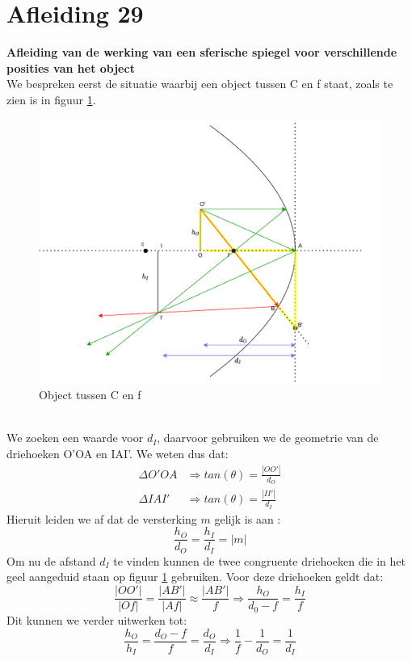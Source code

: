 \documentclass[a4paper,kul]{kulakarticle} %
\begin{document}
\section{Afleiding 29}
\textbf{Afleiding van de werking van een sferische spiegel voor verschillende posities van het object}\\
We bespreken eerst de situatie waarbij een object tussen C en f staat, zoals te zien is in figuur \ref{fig:objecttussen}.
\begin{figure}[h]
	\centering
	\includegraphics[width=0.7\linewidth]{ObjectTussen}
	\caption[Object tussen C en f]{Object tussen C en f}
	\label{fig:objecttussen}
\end{figure}\\
We zoeken een waarde voor $d_I$, daarvoor gebruiken we de geometrie van de driehoeken O'OA en IAI'.  We weten dus dat: 
\begin{align*}
	\Delta O'OA&\Rightarrow tan(\theta) = \frac{|OO'|}{d_O}\\
	\Delta IAI'&\Rightarrow tan(\theta) = \frac{|II'|}{d_I}
\end{align*}
Hieruit leiden we af dat de versterking $m$ gelijk is aan :
\begin{equation*}
	\frac{h_O}{d_O} = \frac{h_I}{d_I} = |m|
\end{equation*}
Om nu de afstand $d_I$ te vinden kunnen de twee congruente driehoeken die in het geel aangeduid staan op figuur \ref{fig:objecttussen} gebruiken. Voor deze driehoeken geldt dat: 
\begin{equation*}
	\frac{|OO'|}{|Of|}=\frac{|AB'|}{|Af|} \approx\frac{|AB'|}{f} \Rightarrow \frac{h_O}{d_0-f} = \frac{h_I}{f}
\end{equation*}
Dit kunnen we verder uitwerken tot:
\begin{equation*}
	\frac{h_O}{h_I} = \frac{d_O-f}{f}=\frac{d_O}{d_I}\Rightarrow\frac{1}{f}-\frac{1}{d_O} = \frac{1}{d_I}
\end{equation*}
\end{document}
